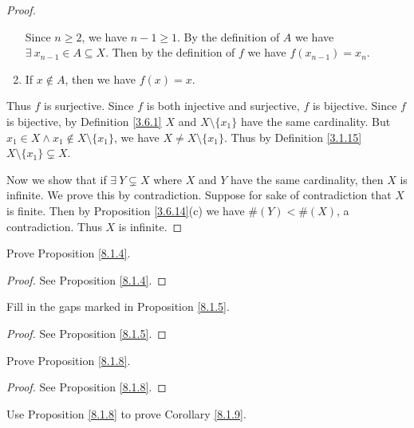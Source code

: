 \begin{proof}
\begin{enumerate}
              Since \(n \geq 2\), we have \(n - 1 \geq 1\).
              By the definition of \(A\) we have \(\exists\ x_{n - 1} \in A \subseteq X\).
              Then by the definition of \(f\) we have \(f(x_{n - 1}) = x_n\).
        \item If \(x \notin A\), then we have \(f(x) = x\).
    \end{enumerate}
    Thus \(f\) is surjective.
    Since \(f\) is both injective and surjective, \(f\) is bijective.
    Since \(f\) is bijective, by Definition \ref{3.6.1} \(X\) and \(X \setminus \{x_1\}\) have the same cardinality.
    But \(x_1 \in X \land x_1 \notin X \setminus \{x_1\}\), we have \(X \neq X \setminus \{x_1\}\).
    Thus by Definition \ref{3.1.15} \(X \setminus \{x_1\} \subsetneq X\).

    Now we show that if \(\exists\ Y \subsetneq X\) where \(X\) and \(Y\) have the same cardinality, then \(X\) is infinite.
    We prove this by contradiction.
    Suppose for sake of contradiction that \(X\) is finite.
    Then by Proposition \ref{3.6.14}(c) we have \(\#(Y) < \#(X)\), a contradiction.
    Thus \(X\) is infinite.
\end{proof}

\begin{exercise}\label{ex 8.1.2}
    Prove Proposition \ref{8.1.4}.
\end{exercise}

\begin{proof}
    See Proposition \ref{8.1.4}.
\end{proof}

\begin{exercise}\label{ex 8.1.3}
    Fill in the gaps marked in Proposition \ref{8.1.5}.
\end{exercise}

\begin{proof}
    See Proposition \ref{8.1.5}.
\end{proof}

\begin{exercise}\label{ex 8.1.4}
    Prove Proposition \ref{8.1.8}.
\end{exercise}

\begin{proof}
    See Proposition \ref{8.1.8}.
\end{proof}

\begin{exercise}\label{ex 8.1.5}
    Use Proposition \ref{8.1.8} to prove Corollary \ref{8.1.9}.
\end{exercise}

